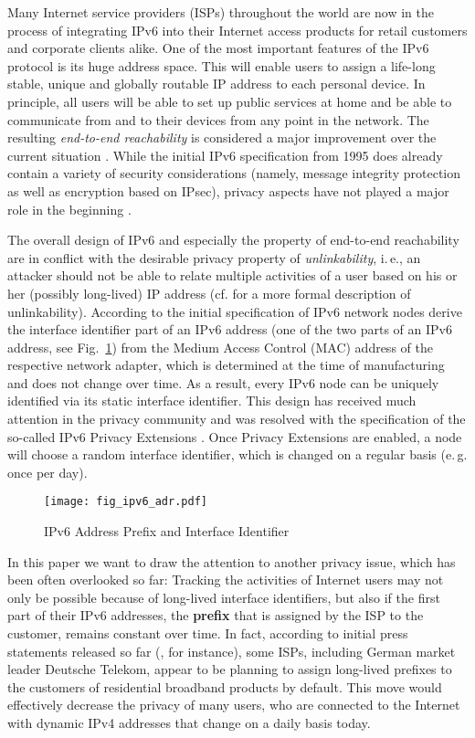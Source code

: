 \documentclass{easychair}
\begin{document}
Many Internet service providers (ISPs) throughout the world are now in the process of integrating IPv6 into their Internet access products for retail customers and corporate clients alike.
One of the most important features of the IPv6 protocol is its huge address space. This will enable users to assign a life-long stable, unique and globally routable IP address to each personal device. In principle, all users will be able to set up public services at home and be able to communicate from and to their devices from any point in the network. The resulting \emph{end-to-end reachability} is considered a major improvement over the current situation \cite{RFC5902}. While the initial IPv6 specification from 1995 does already contain a variety of security considerations (namely, message integrity protection as well as encryption based on IPsec), privacy aspects have not played a major role in the beginning \cite{RFC1883}.

The overall design of IPv6 and especially the property of end-to-end reachability are in conflict with the desirable privacy property of \emph{unlinkability}, i.\,e., an attacker should not be able to relate multiple activities of a user based on his or her (possibly long-lived) IP address (cf. \cite{PH09} for a more formal description of unlinkability). According to the initial specification of IPv6 \cite{RFC1883} network nodes derive the interface identifier part of an IPv6 address (one of the two parts of an IPv6 address, see Fig.~\ref{fig:fig_ipv6_adr}) from the Medium Access Control (MAC) address of the respective network adapter, which is determined at the time of manufacturing and does not change over time. As a result, every IPv6 node can be uniquely identified via its static interface identifier. This design has received much attention in the privacy community and was resolved with the specification of the so-called IPv6 Privacy Extensions \cite{RFC4941}. Once Privacy Extensions are enabled, a node will choose a random interface identifier, which is changed on a regular basis (e.\,g. once per day).

\begin{figure}[htbp]
        \centering
                \texttt{[image: fig\_ipv6\_adr.pdf]}
        \caption{IPv6 Address Prefix and Interface Identifier}
        \label{fig:fig_ipv6_adr}
\end{figure}


In this paper we want to draw the attention to another privacy issue, which has been often overlooked so far: Tracking the activities of Internet users may not only be possible because of long-lived interface identifiers, but also if the first part of their IPv6 addresses, the \textbf{prefix} that is assigned by the ISP to the customer, remains constant over time. In fact, according to initial press statements released so far (\cite{heise2011}, for instance), some ISPs, including German market leader Deutsche Telekom, appear to be planning to assign long-lived prefixes to the customers of residential broadband products by default. This move would effectively decrease the privacy of many users, who are connected to the Internet with dynamic IPv4 addresses that change on a daily basis today.
\end{document}
